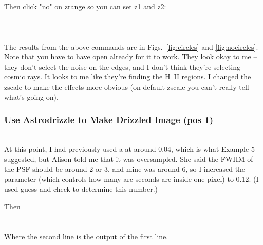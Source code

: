 \documentclass[11pt,obeyspaces]{article} %
\begin{document}
\\
\\
Then click "no" on zrange so you can set z1 and z2:\\
\\
 \\
\\ 



The results from the above commands are in Figs.~\ref{fig:circles} and \ref{fig:nocircles}. Note that you have to have  open already for it to work. They look okay to me -- they don't select the noise on the edges, and I don't think they're selecting cosmic rays. It looks to me like they're finding the H~II regions. I changed the zscale to make the effects more obvious (on default zscale you can't really tell what's going on). 


\subsubsection{Use Astrodrizzle to Make Drizzled Image (pos 1)}

 \\ 

At this point, I had previously used a  at around 0.04, which is what Example 5 suggested, but Alison told me that it was oversampled. She said the FWHM of the PSF should be around 2 or 3, and mine was around 6, so I increased the parameter (which controls how many arc seconds are inside one pixel) to 0.12. (I used guess and check to determine this number.)

Then \\
 \\
 \\
Where the second line is the output of the first line. \\ 
\end{document}
